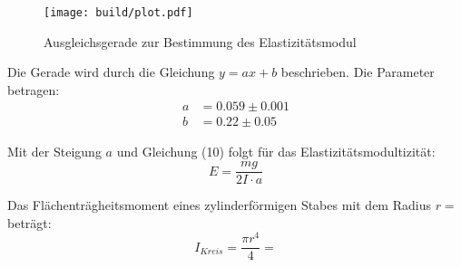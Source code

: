 \begin{figure}[H]
  \centering
  \texttt{[image: build/plot.pdf]}
  \caption{Ausgleichsgerade zur Bestimmung des Elastizitätsmodul}
  \label{fig:Elastizitätsmodul}
\end{figure}

Die Gerade wird durch die Gleichung $y = ax + b$ beschrieben. Die Parameter betragen:
\begin{align*}
  a &= 0.059 \pm 0.001 \\
  b &= 0.22  \pm 0.05
\end{align*}

Mit der Steigung $a$ und Gleichung (10) folgt für das Elastizitätsmodultizität:
\begin{equation}
  E = \frac{mg}{2I \cdot a}
\end{equation}

Das Flächenträgheitsmoment eines zylinderförmigen Stabes mit dem Radius
$r = $ beträgt:
\begin{equation}
  I_{Kreis} = \frac{\pi r^4}{4} =
\end{equation}
